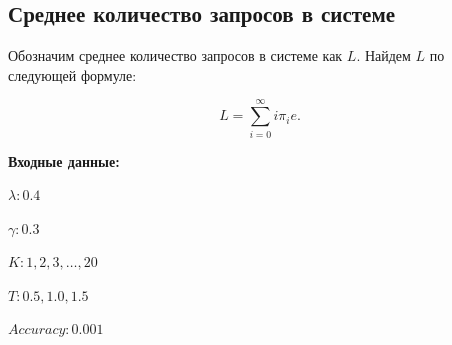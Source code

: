 \documentclass[12pt, a4paper]{article}
\begin{document}
	\subsection{Среднее количество запросов в системе}


Обозначим среднее количество запросов в системе как $L$. Найдем $L$ по следующей формуле:

$$L = \sum\limits_{i = 0}^{\infty} i \pi_i e.$$

\textbf{Входные данные:}

$\lambda: 0.4$

$\gamma: 0.3$

$K: 1, 2, 3, \ldots, 20$

$T: 0.5, 1.0, 1.5$

$Accuracy: 0.001$

\begin{center}
	{\raggedright
		
}
\end{center}
\end{document}
